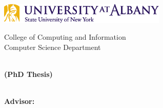\noindent
\begin{minipage}{3.2in}
    \includegraphics[width=3.15in]{img/logo_A2_pms124_269.eps}
\end{minipage}
\hspace{\fill}
\begin{minipage}{2.3in}
    \setlength{\baselineskip}{13pt}
    \makebox{\ } \hfill {\footnotesize College of Computing and Information} \\
    \makebox{\ } \hfill {\footnotesize Computer Science Department}
\end{minipage}

\vspace*{2in}
\begin{center}
    \begin{minipage}{0.75\textwidth}
        \centering
        \begin{spacing}{2}
            \bfseries
            {\huge\thetitle} \\[+1ex]
            (PhD Thesis)
        \end{spacing}
    \end{minipage}
\end{center}

\vspace*{1.5in}
\begin{center}
    \begin{spacing}{1.5}
        \bfseries\large \theauthor \\
        Advisor: \theadvisor \\
        \thedate
    \end{spacing}
\end{center}

